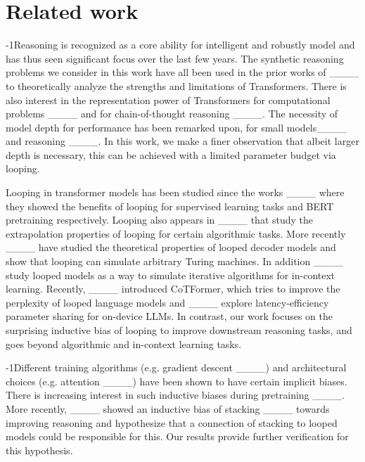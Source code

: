 \section{Related work}
\label{sec:related}
\vspace{-0.12in}

\looseness-1Reasoning is recognized as a core ability for intelligent and robustly model and has thus seen significant focus over the last few years. The synthetic reasoning problems we consider in this work have all been used in the prior works of ____ to theoretically analyze the strengths and limitations of Transformers.
There is also interest in the representation power of Transformers for computational problems ____ and for chain-of-thought reasoning ____.
The necessity of model depth for performance has been remarked upon, for small models____ and reasoning ____. In this work, we make a finer observation that albeit larger depth is necessary, this can be achieved with a limited parameter budget via looping. 

Looping in transformer models has been studied since the works ____ where they showed the benefits of looping for supervised learning tasks and BERT pretraining respectively. 
Looping also appears in ____ that study the extrapolation properties of looping for certain algorithmic tasks.
More recently ____ have studied the theoretical properties of looped decoder models and show that looping can simulate arbitrary Turing machines. 
In addition ____ study looped models as a way to simulate iterative algorithms for in-context learning.
Recently, ____ introduced CoTFormer, which tries to improve the perplexity of looped language models and ____ explore latency-efficiency parameter sharing for on-device LLMs.
In contrast, our work focuses on the surprising inductive bias of looping to improve downstream reasoning tasks, and goes beyond algorithmic and in-context learning tasks.

\looseness-1Different training algorithms (e.g. gradient descent ____) and architectural choices (e.g. attention ____) have been shown to have certain implicit biases. There is increasing interest in such inductive biases during pretraining ____. More recently, ____ showed an inductive bias of stacking ____ towards improving reasoning and hypothesize that a connection of stacking to looped models could be responsible for this. Our results provide further verification for this hypothesis.


